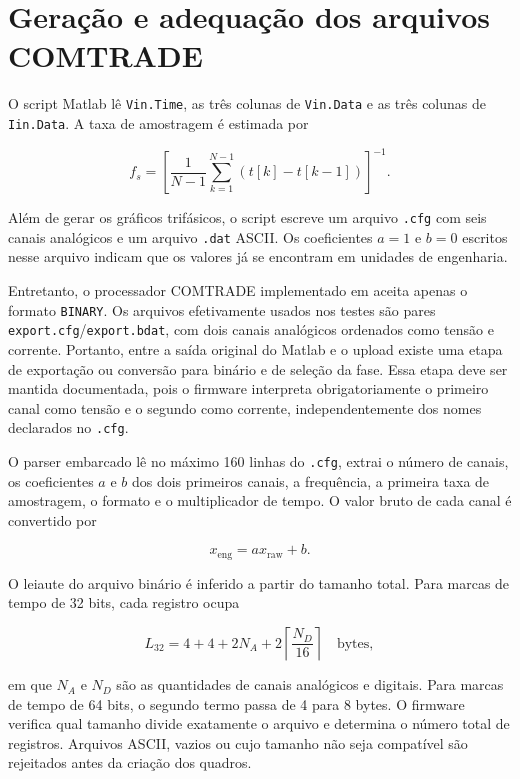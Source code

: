 \section{Geração e adequação dos arquivos COMTRADE}

O script Matlab lê \texttt{Vin.Time}, as três colunas de \texttt{Vin.Data} e as três colunas de \texttt{Iin.Data}. A taxa de amostragem é estimada por

\begin{equation}
  f_s=\left[\frac{1}{N-1}\sum_{k=1}^{N-1}\left(t[k]-t[k-1]\right)\right]^{-1}.
\end{equation}

Além de gerar os gráficos trifásicos, o script escreve um arquivo \texttt{.cfg} com seis canais analógicos e um arquivo \texttt{.dat} ASCII. Os coeficientes $a=1$ e $b=0$ escritos nesse arquivo indicam que os valores já se encontram em unidades de engenharia.

Entretanto, o processador COMTRADE implementado em  aceita apenas o formato \texttt{BINARY}. Os arquivos efetivamente usados nos testes são pares \texttt{export.cfg}/\texttt{export.bdat}, com dois canais analógicos ordenados como tensão e corrente. Portanto, entre a saída original do Matlab e o upload existe uma etapa de exportação ou conversão para binário e de seleção da fase. Essa etapa deve ser mantida documentada, pois o firmware interpreta obrigatoriamente o primeiro canal como tensão e o segundo como corrente, independentemente dos nomes declarados no \texttt{.cfg}.

O parser embarcado lê no máximo 160 linhas do \texttt{.cfg}, extrai o número de canais, os coeficientes $a$ e $b$ dos dois primeiros canais, a frequência, a primeira taxa de amostragem, o formato e o multiplicador de tempo. O valor bruto de cada canal é convertido por

\begin{equation}
  x_{\mathrm{eng}}=a x_{\mathrm{raw}}+b.
  \label{eq:comtrade-conversao}
\end{equation}

O leiaute do arquivo binário é inferido a partir do tamanho total. Para marcas de tempo de 32 bits, cada registro ocupa

\begin{equation}
  L_{32}=4+4+2N_A+2\left\lceil\frac{N_D}{16}\right\rceil \quad \text{bytes},
\end{equation}

em que $N_A$ e $N_D$ são as quantidades de canais analógicos e digitais. Para marcas de tempo de 64 bits, o segundo termo passa de 4 para 8 bytes. O firmware verifica qual tamanho divide exatamente o arquivo e determina o número total de registros. Arquivos ASCII, vazios ou cujo tamanho não seja compatível são rejeitados antes da criação dos quadros.

